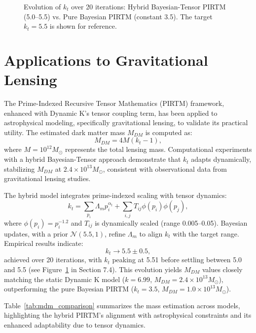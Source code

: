 \documentclass{article}
\theoremstyle{plain}
\begin{document}
\begin{figure}[h]
    \centering
    \caption{Evolution of \( k_t \) over 20 iterations: Hybrid Bayesian-Tensor PIRTM (5.0–5.5) vs. Pure Bayesian PIRTM (constant 3.5). The target \( k_t = 5.5 \) is shown for reference.}
    \label{fig:kt_evolution}
\end{figure}

\section{Applications to Gravitational Lensing}
The Prime-Indexed Recursive Tensor Mathematics (PIRTM) framework, enhanced with Dynamic K’s tensor coupling term, has been applied to astrophysical modeling, specifically gravitational lensing, to validate its practical utility. The estimated dark matter mass \( M_{DM} \) is computed as:
\begin{equation}
    M_{DM} = 4 M (k_t - 1),
\end{equation}
where \( M = 10^{12} M_\odot \) represents the total lensing mass. Computational experiments with a hybrid Bayesian-Tensor approach demonstrate that \( k_t \) adapts dynamically, stabilizing \( M_{DM} \) at \( 2.4 \times 10^{13} M_\odot \), consistent with observational data from gravitational lensing studies.

The hybrid model integrates prime-indexed scaling with tensor dynamics:
\begin{equation}
    k_t = \sum_{p_i} \Lambda_m p_i^{\alpha_t} + \sum_{i,j} T_{ij} \phi(p_i) \phi(p_j),
\end{equation}
where \( \phi(p_i) = p_i^{-1.2} \) and \( T_{ij} \) is dynamically scaled (range 0.005–0.05). Bayesian updates, with a prior \( \mathcal{N}(5.5, 1) \), refine \( \Lambda_m \) to align \( k_t \) with the target range. Empirical results indicate:
\begin{equation}
    k_t \rightarrow 5.5 \pm 0.5,
\end{equation}
achieved over 20 iterations, with \( k_t \) peaking at 5.51 before settling between 5.0 and 5.5 (see Figure~\ref{fig:kt_evolution} in Section 7.4). This evolution yields \( M_{DM} \) values closely matching the static Dynamic K model (\( k = 6.99 \), \( M_{DM} = 2.4 \times 10^{13} M_\odot \)), outperforming the pure Bayesian PIRTM (\( k_t = 3.5 \), \( M_{DM} = 1.0 \times 10^{13} M_\odot \)).

Table~\ref{tab:mdm_comparison} summarizes the mass estimation across models, highlighting the hybrid PIRTM’s alignment with astrophysical constraints and its enhanced adaptability due to tensor dynamics.
\end{document}
